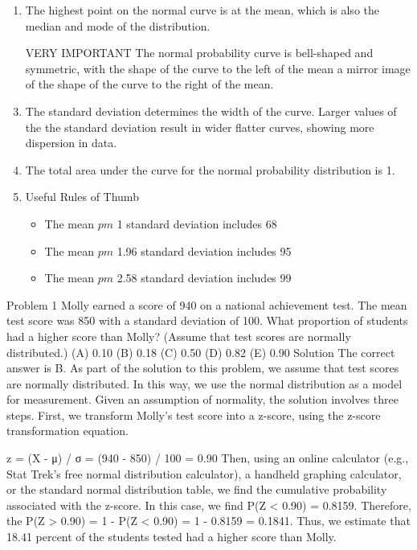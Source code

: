 \documentclass[12pt, a4paper]{report}
\theoremstyle{definition}
\theoremstyle{remark}
\begin{document}
\begin{enumerate}
\item The highest point on the normal curve is at the mean, which is also the median and mode of the distribution.


\item  [VERY IMPORTANT]
The normal probability curve is bell-shaped and symmetric, with the shape of the curve to the left of the mean a mirror image of the shape of the curve to the right of the mean.

\item  The standard deviation determines the width of the curve. Larger values of the the standard deviation result in wider flatter curves, showing more dispersion in data.


\item  The total area under the curve for the normal probability distribution is 1.

\item Useful Rules of Thumb

\begin{itemize}
\item	The mean  $pm$ 1 standard deviation includes 68%

\item	The mean  $pm$ 1.96 standard deviation includes 95%
   
\item	The mean  $pm$ 2.58 standard deviation includes 99%
\end{itemize}
\end{enumerate}
Problem 1
Molly earned a score of 940 on a national achievement test. 
The mean test score was 850 with a standard deviation of 100. 
What proportion of students had a higher score than Molly? (Assume that test scores are normally distributed.)
(A) 0.10 
(B) 0.18 
(C) 0.50 
(D) 0.82 
(E) 0.90
Solution
The correct answer is B. As part of the solution to this problem, we assume that test scores are normally distributed. In this way, we use the normal distribution as a model for measurement. Given an assumption of normality, the solution involves three steps.
First, we transform Molly's test score into a z-score, using the z-score transformation equation. 

z = (X - μ) / σ = (940 - 850) / 100 = 0.90
Then, using an online calculator (e.g., Stat Trek's free normal distribution calculator), a handheld graphing calculator, or the standard normal distribution table, we find the cumulative probability associated with the z-score. In this case, we find P(Z < 0.90) = 0.8159.
Therefore, the P(Z > 0.90) = 1 - P(Z < 0.90) = 1 - 0.8159 = 0.1841.
Thus, we estimate that 18.41 percent of the students tested had a higher score than Molly.
\end{document}

